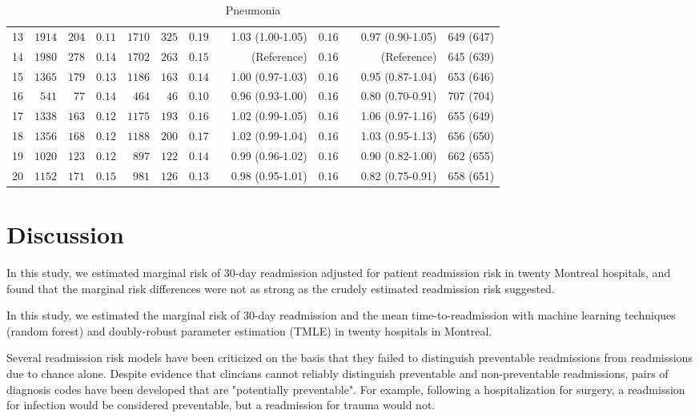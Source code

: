 \documentclass[]{article}\usepackage[]{graphicx}\usepackage[]{color}
\begin{document}
\begin{landscape}
\begin{table}[!tbp]
\begin{center}
\begin{tabular}{lrrrrrrcrrcrr}
13&$1914$&$204$&$0.11$&$1710$&$325$&$0.19$&&1.03 (1.00-1.05)&$0.16$&&0.97 (0.90-1.05)&649 (647)\tabularnewline
14&$1980$&$278$&$0.14$&$1702$&$263$&$0.15$&&(Reference)&$0.16$&&(Reference)&645 (639)\tabularnewline
15&$1365$&$179$&$0.13$&$1186$&$163$&$0.14$&&1.00 (0.97-1.03)&$0.16$&&0.95 (0.87-1.04)&653 (646)\tabularnewline
16&$ 541$&$ 77$&$0.14$&$ 464$&$ 46$&$0.10$&&0.96 (0.93-1.00)&$0.16$&&0.80 (0.70-0.91)&707 (704)\tabularnewline
17&$1338$&$163$&$0.12$&$1175$&$193$&$0.16$&&1.02 (0.99-1.05)&$0.16$&&1.06 (0.97-1.16)&655 (649)\tabularnewline
18&$1356$&$168$&$0.12$&$1188$&$200$&$0.17$&&1.02 (0.99-1.04)&$0.16$&&1.03 (0.95-1.13)&656 (650)\tabularnewline
19&$1020$&$123$&$0.12$&$ 897$&$122$&$0.14$&&0.99 (0.96-1.02)&$0.16$&&0.90 (0.82-1.00)&662 (655)\tabularnewline
20&$1152$&$171$&$0.15$&$ 981$&$126$&$0.13$&&0.98 (0.95-1.01)&$0.16$&&0.82 (0.75-0.91)&658 (651)\tabularnewline
\hline
\end{tabular}

\caption{Pneumonia\label{pre.format}}\end{center}

\end{table}






\setmainfont[Scale=1.25]{Cambria}
\linespread{1.25}


\end{landscape}
\section{Discussion}
In this study, we estimated marginal risk of 30-day readmission adjusted for patient readmission risk in twenty Montreal hospitals, and found that the marginal risk differences were not as strong as the crudely estimated readmission risk suggested. 

In this study, we estimated the marginal risk of 30-day readmission and the mean time-to-readmission with machine learning techniques (random forest) and doubly-robust parameter estimation (TMLE) in twenty hospitals in Montreal.

Several readmission risk models have been criticized on the basis that they failed to distinguish preventable readmissions from readmissions due to chance alone. Despite evidence that clincians cannot reliably distinguish preventable and non-preventable readmissions, pairs of diagnosis codes have been developed that are "potentially preventable". For example, following a hospitalization for surgery, a readmission for infection would be considered preventable, but a readmission for trauma would not.
\end{document}
